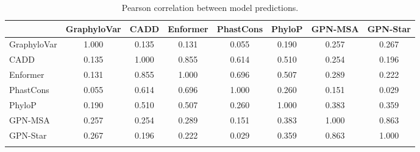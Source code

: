 \begin{table}[htbp]
\centering
\small
\caption{Pearson correlation between model predictions.}
\label{tab:pearson_corr}
\begin{tabular}{lccccccc}
\toprule
& GraphyloVar & CADD & Enformer & PhastCons & PhyloP & GPN-MSA & GPN-Star \\
\midrule
GraphyloVar & 1.000 & 0.135 & 0.131 & 0.055 & 0.190 & 0.257 & 0.267 \\
CADD & 0.135 & 1.000 & 0.855 & 0.614 & 0.510 & 0.254 & 0.196 \\
Enformer & 0.131 & 0.855 & 1.000 & 0.696 & 0.507 & 0.289 & 0.222 \\
PhastCons & 0.055 & 0.614 & 0.696 & 1.000 & 0.260 & 0.151 & 0.029 \\
PhyloP & 0.190 & 0.510 & 0.507 & 0.260 & 1.000 & 0.383 & 0.359 \\
GPN-MSA & 0.257 & 0.254 & 0.289 & 0.151 & 0.383 & 1.000 & 0.863 \\
GPN-Star & 0.267 & 0.196 & 0.222 & 0.029 & 0.359 & 0.863 & 1.000 \\
\botrule
\end{tabular}
\end{table}

